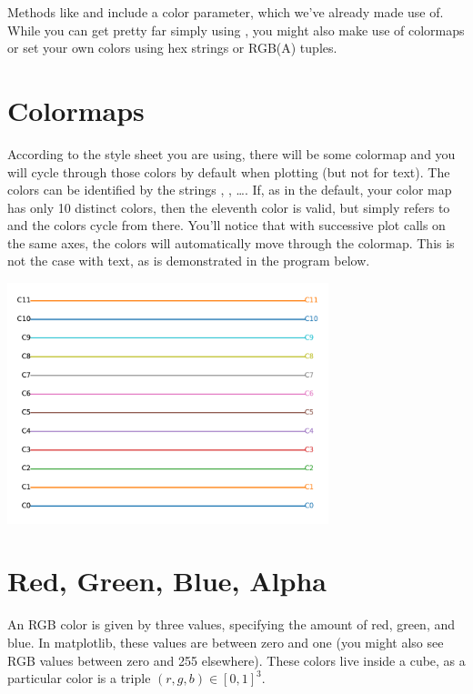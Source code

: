 Methods like  and  include a color parameter, which we've already made use of. While you can get pretty far simply using , you might also make use of colormaps or set your own colors using hex strings or RGB(A) tuples. 

\section{Colormaps}

According to the style sheet you are using, there will be some colormap and you will cycle through those colors by default when plotting (but not for text). The colors can be identified by the strings , , \dots. If, as in the default, your color map has only 10 distinct colors, then the eleventh color  is valid, but simply refers to  and the colors cycle from there. You'll notice that with successive plot calls on the same axes, the colors will automatically move through the colormap. This is not the case with text, as is demonstrated in the program below. 


 \begin{center}
     \includegraphics[width = 0.7\textwidth]{figures/proseplots/colors.pdf}
 \end{center}
 
 
 \section{Red, Green, Blue, Alpha}
 
 An RGB color is given by three values, specifying the amount of red, green, and blue. In matplotlib, these values are between zero and one (you might also see RGB values between zero and 255 elsewhere). These colors live inside a cube, as a particular color is a triple $(r,g,b) \in [0,1]^3$. 

